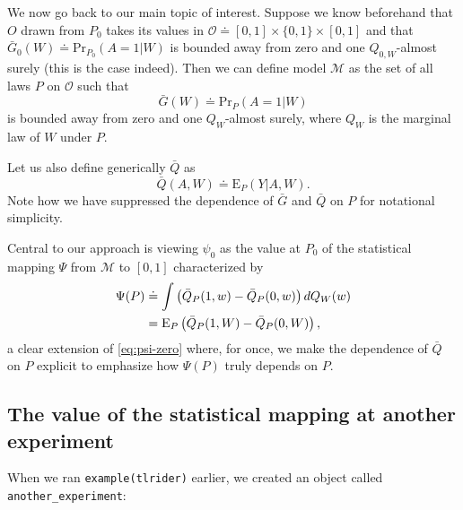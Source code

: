 \documentclass[11pt,openright,twoside]{book}
\newcommand{\defq}{\doteq}
\newcommand{\calM}{\mathcal{M}}
\newcommand{\calO}{\mathcal{O}}
\newcommand{\Exp}{\textrm{E}}
\newcommand{\Gbar}{\bar{G}}
\renewcommand{\Pr}{\textrm{Pr}}
\newcommand{\Qbar}{\bar{Q}}
\theoremstyle{definition}
\theoremstyle{definition}
\theoremstyle{definition}
\theoremstyle{remark}
\begin{document}
We now go back to our main topic of interest. Suppose we know beforehand that
\(O\) drawn from \(P_{0}\) takes its values in \(\calO \defq [0,1] \times \{0,1\} \times [0,1]\) and that \(\Gbar_{0}(W) \defq \Pr_{P_{0}}(A=1|W)\) is bounded away from
zero and one \(Q_{0,W}\)-almost surely (this is the case indeed). Then we can
define model \(\calM\) as the set of all laws \(P\) on \(\calO\) such that
\begin{equation*}\Gbar(W)  \defq \Pr_{P}(A=1|W)\end{equation*} is bounded away
from zero and one \(Q_{W}\)-almost surely, where \(Q_{W}\) is the marginal law of
\(W\) under \(P\).

Let us also define generically \(\Qbar\) as \begin{equation*}\Qbar (A,W) \defq
\Exp_{P} (Y|A, W).\end{equation*} Note how we have suppressed the dependence
of \(\Gbar\) and \(\Qbar\) on \(P\) for notational simplicity.

Central to our approach is viewing \(\psi_{0}\) as the value at \(P_{0}\) of the
statistical mapping \(\Psi\) from \(\calM\) to \([0,1]\) characterized by
\begin{align}  \Psi(P)  &\defq  \int  \left(\Qbar_P(1,  w)  -  \Qbar_P(0,
w)\right)  dQ_{W}(w)   \label{eq:psimap}\\  &=  \Exp_{P}  \left(\Qbar_P(1,   W)  -
\Qbar_P(0,   W)\right),    \notag   \end{align} a clear extension of
\eqref{eq:psi-zero} where, for once, we make the dependence of \(\Qbar\) on \(P\)
explicit to emphasize how \(\Psi(P)\) truly depends on \(P\).

\hypertarget{value-another-experiment}{%
\subsection{The value of the statistical mapping at another experiment}\label{value-another-experiment}}

When we ran \texttt{example(tlrider)} earlier, we created an object called
\texttt{another\_experiment}:
\end{document}
